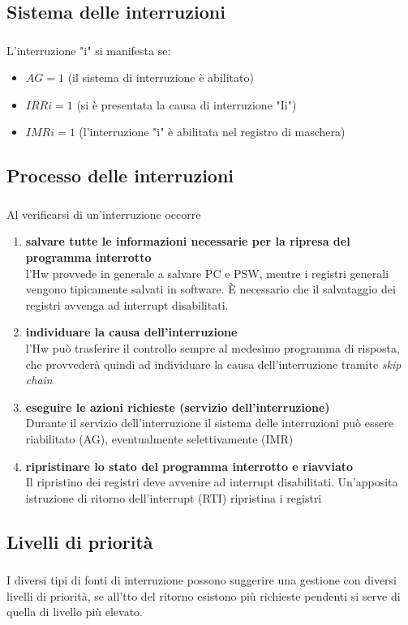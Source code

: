\documentclass{beamer}
\newenvironment{mainframe}{
	\begin{frame}
		\frametitle{\insertsubsection}
		\framesubtitle{\insertsection}
	}{
	\end{frame}
}
\begin{document}
\subsection{Sistema delle interruzioni}
\begin{mainframe}
	L'interruzione "i" si manifesta se:
	\begin{itemize}
		\item $AG = 1$ (il sistema di interruzione è abilitato)
		\item $IRRi = 1$ (si è presentata la causa di interruzione "Ii")
		\item $IMRi = 1$ (l'interruzione "i" è abilitata nel registro di maschera)
	\end{itemize}
\end{mainframe}
\subsection{Processo delle interruzioni}
\begin{mainframe}
	Al verificarsi di un'interruzione occorre
	\begin{enumerate}
		\item \textbf{salvare tutte le informazioni necessarie per la ripresa del programma interrotto}\\
		l'Hw provvede in generale a salvare PC e PSW, mentre i registri generali vengono tipicamente salvati in software. È necessario che il salvataggio dei registri avvenga ad interrupt disabilitati.
		\item \textbf{individuare la causa dell'interruzione}\\
		l'Hw può trasferire il controllo sempre al medesimo programma di risposta, che provvederà quindi ad individuare la causa dell'interruzione tramite \textit{skip chain}
		\item \textbf{eseguire le azioni richieste (servizio dell'interruzione)}\\
		Durante il servizio dell'interruzione il sistema delle interruzioni può essere riabilitato (AG), eventualmente selettivamente (IMR)
		\item \textbf{ripristinare lo stato del programma interrotto e riavviato}\\
		Il ripristino dei registri deve avvenire ad interrupt disabilitati. Un'apposita istruzione di ritorno dell'interrupt (RTI) ripristina i registri
	\end{enumerate}
\end{mainframe}
\subsection{Livelli di priorità}
\begin{mainframe}
	I diversi tipi di fonti di interruzione possono suggerire una gestione con diversi livelli di priorità, se all'tto del ritorno esistono più richieste pendenti si serve di quella di livello più elevato.
\end{mainframe}
\end{document}
